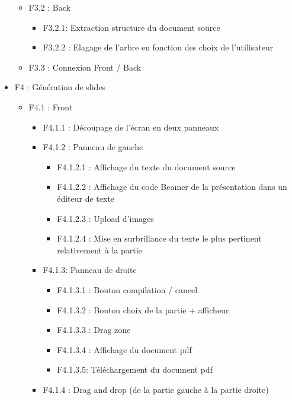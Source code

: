 \documentclass[12pt]{article}
\begin{document}
\begin{itemize}
\begin{itemize}
        \item F3.2 : Back
        \begin{itemize}
            \item F3.2.1: Extraction structure du document source
            \item F3.2.2 : Elagage de l'arbre en fonction des choix de l'utilisateur
        \end{itemize}
        \item F3.3 : Connexion Front / Back
    \end{itemize}
    \item F4 : Génération de slides
    \begin{itemize}
        \item F4.1 : Front
        \begin{itemize}
            \item F4.1.1 : Découpage de l'écran en deux panneaux
            \item F4.1.2 : Panneau de gauche
            \begin{itemize}
                \item F4.1.2.1 : Affichage du texte du document source
                \item F4.1.2.2 : Affichage du code Beamer de la présentation dans un éditeur de texte 
                \item F4.1.2.3 : Upload d'images 
                \item F4.1.2.4 : Mise en surbrillance du texte le plus pertinent relativement à la partie 
            \end{itemize}
            \item F4.1.3: Panneau de droite
            \begin{itemize}
                \item F4.1.3.1 : Bouton compilation / cancel 
                \item F4.1.3.2 : Bouton choix de la partie + afficheur 
                \item F4.1.3.3 : Drag zone 
                \item F4.1.3.4 : Affichage du document pdf 
                \item F4.1.3.5: Téléchargement du document pdf
            \end{itemize}
            
            \item F4.1.4 : Drag and drop (de la partie gauche à la partie droite)
        \end{itemize}
        

\end{itemize}
\end{itemize}
\end{document}
